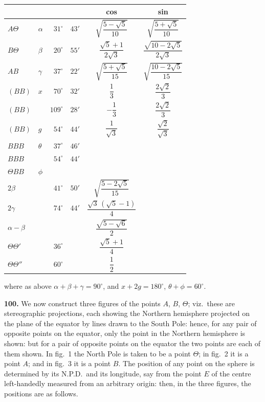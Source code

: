 \documentclass[11pt,a4paper]{article}
\newcommand{\artno}[1]{\textbf{#1.}\quad}
\begin{document}
\begin{center}
\small
\begin{tabular}{l@{\quad}l@{\qquad}r@{\;\;}l@{\qquad}c@{\qquad}c}
        &              & \multicolumn{2}{c}{} & cos & sin\\\hline
$A\Theta$ & $\alpha$ & $31^{\circ}$ & $43'$ &
  $\sqrt{\dfrac{5-\sqrt5}{10}}$ & $\sqrt{\dfrac{5+\sqrt5}{10}}$\\[6pt]
$B\Theta$ & $\beta$  & $20^{\circ}$ & $55'$ &
  $\dfrac{\sqrt5+1}{2\sqrt3}$ & $\dfrac{\sqrt{10-2\sqrt5}}{2\sqrt3}$\\[6pt]
$AB$ & $\gamma$ & $37^{\circ}$ & $22'$ &
  $\sqrt{\dfrac{5+\sqrt5}{15}}$ & $\sqrt{\dfrac{10-2\sqrt5}{15}}$\\[6pt]
$(B B)$ & $x$ & $70^{\circ}$ & $32'$ & $\dfrac{1}{3}$ & $\dfrac{2\sqrt2}{3}$\\[6pt]
$(B B)$ & & $109^{\circ}$ & $28'$ & $-\dfrac{1}{3}$ & $\dfrac{2\sqrt2}{3}$\\[6pt]
$(BB)$ & $g$ & $54^{\circ}$ & $44'$ & $\dfrac{1}{\sqrt3}$ & $\dfrac{\sqrt2}{\sqrt3}$\\[6pt]
$BBB$ & $\theta$ & $37^{\circ}$ & $46'$ & & \\[3pt]
$BBB$ & & $54^{\circ}$ & $44'$ & & \\[3pt]
$\Theta BB$ & $\phi$ & & & & \\[3pt]
$2\beta$ & & $41^{\circ}$ & $50'$ &
  $\sqrt{\dfrac{5-2\sqrt5}{15}}$ & \\[6pt]
$2\gamma$ & & $74^{\circ}$ & $44'$ &
  $\dfrac{\sqrt3\,(\sqrt5-1)}{4}$ & \\[6pt]
$\alpha-\beta$ & & & & $\dfrac{\sqrt{5-\sqrt6}}{2}$ & \\[6pt]
$\Theta\Theta'$ & & $36^{\circ}$ & &
  $\dfrac{\sqrt5+1}{4}$ & \\[6pt]
$\Theta\Theta''$ & & $60^{\circ}$ & &
  $\dfrac{1}{2}$ & \\
\end{tabular}
\end{center}
\normalsize
\noindent where as above $\alpha + \beta + \gamma = 90^{\circ}$, and
$x + 2g = 180^{\circ}$, $\theta + \phi = 60^{\circ}$.

\artno{100} We now construct three figures of the points $A$, $B$, $\Theta$;
viz.\ these are stereographic projections, each showing the Northern
hemisphere projected on the plane of the equator by lines drawn to the
South Pole: hence, for any pair of opposite points on the equator, only the
point in the Northern hemisphere is shown: but for a pair of opposite points
on the equator the two points are each of them shown. In fig.~1 the North
Pole is taken to be a point $\Theta$; in fig.~2 it is a point $A$; and in
fig.~3 it is a point $B$. The position of any point on the sphere is
determined by its N.P.D.\ and its longitude, say from the point $E$ of the
centre left-handedly measured from an arbitrary origin: then, in the three
figures, the positions are as follows.
\end{document}
